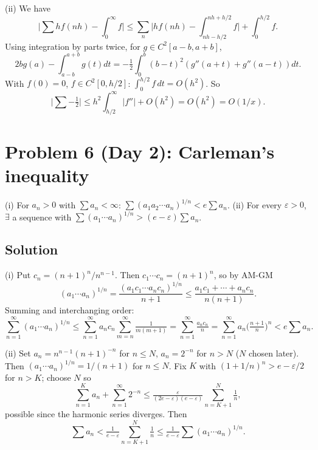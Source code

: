 \documentclass{article}
\begin{document}
(ii) We have
\[
\Big|\sum hf(nh) - \int_0^\infty f\Big| \leq \sum_n\Big|hf(nh) - \int_{nh-h/2}^{nh+h/2} f\Big| + \int_0^{h/2} f.
\]
Using integration by parts twice, for $g\in C^2[a-b, a+b]$,
\[
2bg(a) - \int_{a-b}^{a+b} g(t)dt = -\tfrac{1}{2}\int_0^b (b-t)^2 (g''(a+t) + g''(a-t))dt.
\]
With $f(0) = 0$, $f \in C^2[0, h/2]$: $\int_0^{h/2} f\,dt = O(h^2)$. So
\[
\Big|\sum - \tfrac{1}{2}\Big| \leq h^2 \int_{h/2}^\infty |f''| + O(h^2) = O(h^2) = O(1/x).
\]

\section*{Problem 6 (Day 2): Carleman's inequality}
(i) For $a_n > 0$ with $\sum a_n < \infty$: $\sum (a_1 a_2 \cdots a_n)^{1/n} < e \sum a_n$.
(ii) For every $\varepsilon > 0$, $\exists$ a sequence with $\sum (a_1\cdots a_n)^{1/n} > (e-\varepsilon)\sum a_n$.

\subsection*{Solution}
(i) Put $c_n = (n+1)^n / n^{n-1}$. Then $c_1\cdots c_n = (n+1)^n$, so by AM-GM
\[
(a_1\cdots a_n)^{1/n} = \frac{(a_1 c_1\cdots a_n c_n)^{1/n}}{n+1} \leq \frac{a_1 c_1 + \cdots + a_n c_n}{n(n+1)}.
\]
Summing and interchanging order:
\[
\sum_{n=1}^\infty (a_1\cdots a_n)^{1/n} \leq \sum_{n=1}^\infty a_n c_n \sum_{m=n}^\infty \tfrac{1}{m(m+1)} = \sum_{n=1}^\infty \tfrac{a_n c_n}{n} = \sum_{n=1}^\infty a_n\Big(\tfrac{n+1}{n}\Big)^n < e\sum a_n.
\]

(ii) Set $a_n = n^{n-1}(n+1)^{-n}$ for $n\leq N$, $a_n = 2^{-n}$ for $n > N$ ($N$ chosen later). Then $(a_1\cdots a_n)^{1/n} = 1/(n+1)$ for $n\leq N$. Fix $K$ with $(1+1/n)^n > e - \varepsilon/2$ for $n > K$; choose $N$ so
\[
\sum_{n=1}^K a_n + \sum_{n=1}^\infty 2^{-n} \leq \tfrac{\varepsilon}{(2e-\varepsilon)(e-\varepsilon)} \sum_{n=K+1}^N \tfrac{1}{n},
\]
possible since the harmonic series diverges. Then
\[
\sum a_n < \tfrac{1}{e-\varepsilon}\sum_{n=K+1}^N \tfrac{1}{n} \leq \tfrac{1}{e-\varepsilon}\sum (a_1\cdots a_n)^{1/n}.
\]
\end{document}
